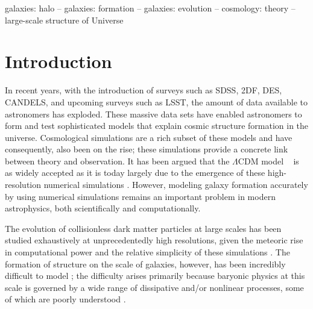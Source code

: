 \documentclass[a4paper,fleqn,usenatbib]{mnras}
\begin{document}
\begin{keywords}
galaxies: halo -- galaxies: formation -- galaxies: evolution -- cosmology: theory -- large-scale structure of Universe
\end{keywords}

\section{Introduction} \label{mgf:intro}
\par
In recent years, with the introduction of surveys such as SDSS, 2DF, DES, CANDELS, and upcoming surveys such as LSST, the amount of data available to astronomers has exploded. These massive data sets have enabled astronomers to form and test sophisticated models that explain cosmic structure formation in the universe. Cosmological simulations are a rich subset of these models and have consequently, also been on the rise; these simulations provide a concrete link between theory and observation. It has been argued that the $\Lambda$CDM model ~\citep{peebles1982large, blumenthal1984formation, davis1985evolution} is as widely accepted as it is today largely due to the emergence of these high-resolution numerical simulations \citep{springel2005cosmological}. However, modeling galaxy formation accurately by using numerical simulations remains an important problem in modern astrophysics, both scientifically and computationally. 
\par
	The evolution of collisionless dark matter particles at large scales has been studied exhaustively at unprecedentedly high resolutions, given the meteoric rise in computational power and the relative simplicity of these simulations \citep{springel2005cosmological, springel2005simulations, klypin2011dark, angulo2012scaling, skillman2014dark}. The formation of structure on the scale of galaxies, however, has been incredibly difficult to model \citep{somerville2014physical}; the difficulty arises primarily because baryonic physics at this scale is governed by a wide range of dissipative and/or nonlinear processes, some of which are poorly understood \citep{kang2005semianalytical, baugh2006primer, somerville2014physical}. 
    
\end{document}
